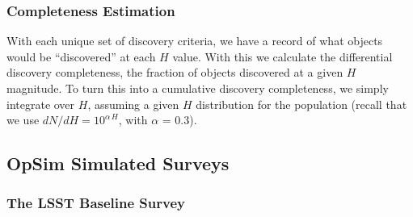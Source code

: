 \subsubsection{Completeness Estimation}

With each unique set of discovery criteria, we have a record of what objects would be ``discovered'' at each $H$ value.
With this we calculate the differential discovery completeness, the fraction of objects discovered at a given $H$ magnitude.
To turn this into a cumulative discovery completeness, we simply integrate over $H$, assuming a given $H$ distribution
for the population (recall that we use $dN/dH = 10^{\alpha\, H}$, with $\alpha$ = 0.3).


\subsection{OpSim Simulated Surveys \label{sec:surveys}}

\subsubsection{The LSST Baseline Survey}

